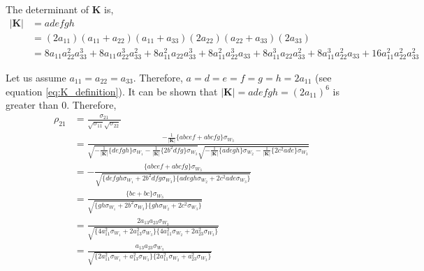 \documentclass{article}
\begin{document}
The determinant of $\mathbf{K}$ is,
\begin{equation}
\begin{aligned}
|\mathbf{K}| &= adefgh \\
&= (2a_{11})(a_{11}+a_{22})(a_{11}+a_{33})(2a_{22})(a_{22}+a_{33})(2a_{33}) \\
&= 8 a_{11} a_{22}^{2} a_{33}^{3} + 8 a_{11} a_{22}^{3} a_{33}^{2} + 8 a_{11}^{2} a_{22} a_{33}^{3} + 8 a_{11}^{2} a_{22}^{3} a_{33} + 8 a_{11}^{3} a_{22} a_{33}^{2} + 8 a_{11}^{3} a_{22}^{2} a_{33} + 16 a_{11}^{2} a_{22}^{2} a_{33}^{2}
\end{aligned}
\label{eq:network3by3_detK_confounder}
\end{equation}

Let us assume $a_{11}=a_{22}=a_{33}$. Therefore, $a=d=e=f=g=h=2a_{11}$ (see equation \ref{eq:K_definition}). It can be shown that $|\mathbf{K}|=adefgh=(2a_{11})^6$ is greater than 0. Therefore,
\begin{equation}
\begin{aligned}
\rho_{21}&=\frac{\sigma_{21}}{\sqrt{\sigma_{11}} \sqrt{\sigma_{22}}} \\[8pt]
&= \frac{ -\frac{1}{|\mathbf{K}|} \{ abcef+abcfg \} \sigma_{W_{3}} }{ \sqrt{-\frac{1}{|\mathbf{K}|} \{ defgh \}\sigma_{W_{1}} -\frac{1}{|\mathbf{K}|} \{ 2b^2 dfg \} \sigma_{W_{3}}} \sqrt{-\frac{1}{|\mathbf{K}|} \{ adegh \}\sigma_{W_{2}} -\frac{1}{|\mathbf{K}|} \{ 2c^2ade \} \sigma_{W_{3}}} } \\[8pt]
&=-\frac{ \{ abcef+abcfg \} \sigma_{W_{3}} }{ \sqrt{ \{ defgh \sigma_{W_{1}} + 2b^2 dfg \sigma_{W_{3}} \} \{  adegh \sigma_{W_{2}} + 2c^2ade \sigma_{W_{3}} \} }} \\[8pt]
&=\frac{ \{ bc+bc \} \sigma_{W_{3}} }{ \sqrt{ \{ gh \sigma_{W_{1}} + 2b^2 \sigma_{W_{3}} \} \{ gh \sigma_{W_{2}} + 2c^2 \sigma_{W_{3}} \} }} \\[8pt]
&=\frac{ 2a_{13} a_{23} \sigma_{W_{3}} }{ \sqrt{ \{ 4 a_{11}^2  \sigma_{W_{1}} + 2 a_{13}^2 \sigma_{W_{3}} \} \{ 4 a_{11}^2 \sigma_{W_{2}} + 2a_{23}^2 \sigma_{W_{3}} \} }} \\[8pt]
&=\frac{ a_{13} a_{23} \sigma_{W_{3}} }{ \sqrt{ \{ 2 a_{11}^2  \sigma_{W_{1}} +  a_{13}^2 \sigma_{W_{3}} \} \{ 2 a_{11}^2 \sigma_{W_{2}} + a_{23}^2 \sigma_{W_{3}} \} }} \\
\end{aligned}
\label{eq:d26_rho21_confounder}
\end{equation}
\end{document}
